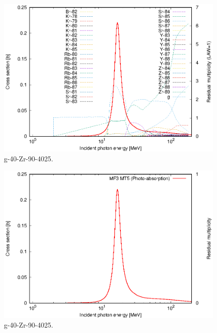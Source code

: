 \begin{figure}
 \includegraphics[width=\linewidth]{eps/g_40-Zr-90_4025.eps}
  \caption{g-40-Zr-90-4025.}
\end{figure}
\begin{figure}
 \includegraphics[width=\linewidth]{eps-law0/g_40-Zr-90_4025.eps}
 \caption{g-40-Zr-90-4025.}
\end{figure}
\newpage \clearpage


